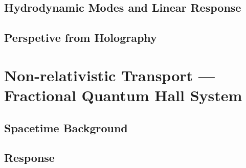 \documentclass[10pt,nofootinbib]{revtex4}
\begin{document}
	\subsection{Hydrodynamic Modes and Linear Response}
	\subsection{Perspetive from Holography}

\section{Non-relativistic Transport --- Fractional Quantum Hall System}
	\subsection{Spacetime Background}
	\subsection{Response}



\end{document}

